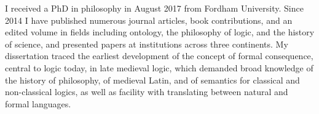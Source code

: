 I received a PhD in philosophy 
in August 2017 
from Fordham University. 
Since 2014 I have published 
numerous journal articles, book contributions, and an edited volume 
in fields including 
ontology, 
the philosophy of logic, 
and the history of science, 
and presented papers at institutions across three continents.
My dissertation traced the earliest development of the concept of formal consequence, 
central to logic today, 
in late medieval logic, 
which demanded 
broad knowledge 
of the history of philosophy, 
of medieval Latin, 
and of semantics for classical and non-classical logics, 
as well as  
facility with translating between natural and formal languages.